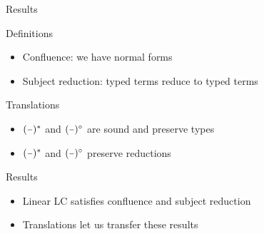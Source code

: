 \documentclass[10pt]{beamer}
\newcommand{\minus}{\scalebox{0.75}[1.0]{$-$}}
\begin{document}
\begin{frame}[fragile]{Results}

  \begin{alertblock}{Definitions}
    \begin{itemize}
      \item Confluence: we have normal forms
      \item Subject reduction: typed terms reduce to typed terms
    \end{itemize}
  \end{alertblock}

  \begin{alertblock}{Translations}
    \begin{itemize}
      \item $(\minus)^*$ and $(\minus)^\circ$ are sound and preserve types
      \item $(\minus)^*$ and $(\minus)^\circ$ preserve reductions
    \end{itemize}
  \end{alertblock}

  \begin{alertblock}{Results}
    \begin{itemize}
      \item Linear LC satisfies confluence and subject reduction
      \item Translations let us transfer these results
    \end{itemize}
  \end{alertblock}
\end{frame}
\end{document}
